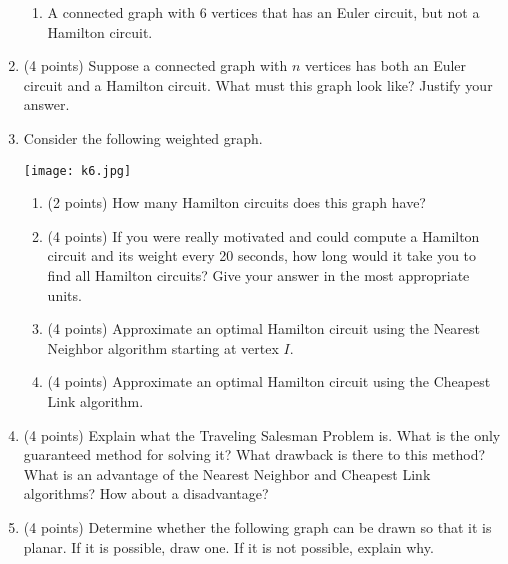 \documentclass[11pt]{article}
\theoremstyle{definition}
\begin{document}
\begin{enumerate}
\begin{enumerate}
\item A connected graph with 6 vertices that has an Euler circuit, but not a Hamilton circuit.

\end{enumerate}

\item (4 points) Suppose a connected graph with $n$ vertices has both an Euler circuit and a Hamilton circuit.  What must this graph look like?  Justify your answer.

\item Consider the following weighted graph.

\begin{multicols}{2}

\begin{center}
\texttt{[image: k6.jpg]}
\end{center}

\begin{enumerate}

\item (2 points) How many Hamilton circuits does this graph have?

\item (4 points) If you were really motivated and could compute a Hamilton circuit and its weight every 20 seconds, how long would it take you to find all Hamilton circuits?  Give your answer in the most appropriate units.

\item (4 points) Approximate an optimal Hamilton circuit using the Nearest Neighbor algorithm starting at vertex $I$.

\item (4 points) Approximate an optimal Hamilton circuit using the Cheapest Link algorithm.

\end{enumerate}

\end{multicols}

\item (4 points) Explain what the Traveling Salesman Problem is.  What is the only guaranteed method for solving it?  What drawback is there to this method?  What is an advantage of the Nearest Neighbor and Cheapest Link algorithms?  How about a disadvantage?

\item (4 points) Determine whether the following graph can be drawn so that it is planar.  If it is possible, draw one.  If it is not possible, explain why.


\end{enumerate}
\end{document}
